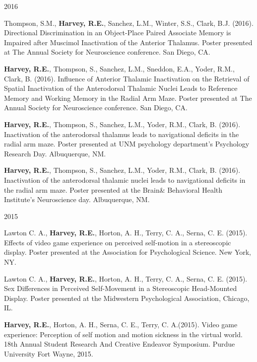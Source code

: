 \begin{cventries}
\cventry
    {} %
    {} %
    {} %
    {2016} %
    {
      \begin{cvitems} %
      \setlength\itemsep{0.4em}
        \item {Thompson, S.M., \textbf{Harvey, R.E.}, Sanchez, L.M., Winter, S.S., Clark, B.J. (2016). Directional Discrimination in an Object-Place Paired Associate Memory is Impaired after Muscimol Inactivation of the Anterior Thalamus. Poster presented at The Annual Society for Neuroscience conference. San Diego, CA.}
        \item {\textbf{Harvey, R.E.}, Thompson, S., Sanchez, L.M., Sneddon, E.A., Yoder, R.M., Clark, B. (2016). Influence of Anterior Thalamic Inactivation on the Retrieval of Spatial Inactivation of the Anterodorsal Thalamic Nuclei Leads to Reference Memory and Working Memory in the Radial Arm Maze. Poster presented at The Annual Society for Neuroscience conference. San Diego, CA.}
        \item {\textbf{Harvey, R.E.}, Thompson, S., Sanchez, L.M., Yoder, R.M., Clark, B. (2016). Inactivation of the anterodorsal thalamus leads to navigational deficits in the radial arm maze. Poster presented at UNM psychology department’s Psychology Research Day. Albuquerque, NM.}
        \item {\textbf{Harvey, R.E.}, Thompson, S., Sanchez, L.M., Yoder, R.M., Clark, B. (2016). Inactivation of the anterodorsal thalamic nuclei leads to navigational deficits in the radial arm maze. Poster presented at the Brain\& Behavioral Health Institute’s Neuroscience day. Albuquerque, NM.}
      \end{cvitems}
    }
\end{cventries}


\begin{cventries}
\cventry
    {} %
    {} %
    {} %
    {2015} %
    {
      \begin{cvitems} %
      \setlength\itemsep{0.4em}
        \item {Lawton C. A., \textbf{Harvey, R.E.}, Horton, A. H., Terry, C. A., Serna, C. E. (2015). Effects of video game experience on perceived self-motion in a stereoscopic display. Poster presented at the Association for Psychological Science. New York, NY.}
        \item {Lawton C. A., \textbf{Harvey, R.E.}, Horton, A. H., Terry, C. A., Serna, C. E. (2015). Sex Differences in Perceived Self-Movement in a Stereoscopic Head-Mounted Display. Poster presented at the Midwestern Psychological Association, Chicago, IL.}
        \item {\textbf{Harvey, R.E.}, Horton, A. H., Serna, C. E., Terry, C. A.(2015). Video game experience: Perception of self motion and motion sickness in the virtual world. 18th Annual Student Research And Creative Endeavor Symposium. Purdue University Fort Wayne, 2015.}
      \end{cvitems}
    }
\end{cventries}


